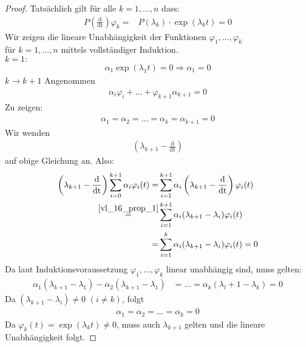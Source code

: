 \begin{proof}
	Tatsächlich gilt für alle $k = 1, \hdots, n $ dass: 
	\begin{align*}
		P \left(\frac{\mathrm{d}}{\mathrm{dt}}\right) \varphi_k = &
			P(\lambda_k)  \cdot \exp(\lambda_k t) = 0
	\end{align*}
	Wir zeigen die lineare Unabhängigkeit der Funktionen $\varphi_1, \hdots, 
	\varphi_k$ \\ für $k = 1, \hdots, n$ mittels vollständiger Induktion. \\
	\emph{$k=1:$} 
	\begin{align*}
		\alpha_1\exp(\lambda_1t) = 0 \Rightarrow \alpha_1 = 0
	\end{align*}
	\emph{$k \rightarrow k+1$} Angenommen
	\begin{align*}
		\alpha_i \varphi_i + \hdots + \varphi_{k+1} \alpha_{k+1} = 0
	\end{align*}
	Zu zeigen: 
	\begin{align*}
		\alpha_1 = \alpha_2 = \hdots = \alpha_k = \alpha_{k+1} = 0
	\end{align*}		
	Wir wenden
	\begin{align*}
		\left(\lambda_{k+1} - \frac{\mathrm{d}}{\mathrm{dt}}\right)
	\end{align*} auf obige Gleichung an.
	Also: 
	\begin{align*}
		\left(\lambda_{k+1}-\frac{\mathrm{d}}{\mathrm{dt}}\right) 
			\sum_{i=0}^{k+1} \alpha_i \varphi_i(t) 
		= & \sum_{i=1}^{k+1} \alpha_i \left( \lambda_{k+1} - 
			\frac{\mathrm{d}}{\mathrm{dt}} \right) \varphi_i(t) \\ 
		\overset{\ref{vl_16_prop_1}}{=} & \sum_{i=1}^{k+1} \alpha_i (\lambda_{k+1} - \lambda_i) 
			\varphi_i(t) \\
		= & \sum_{i = 1}^k \alpha_i(\lambda_{k+1} - \lambda_i) \varphi_i(t) 
	= 0
	\end{align*}
	Da laut Induktionsvoraussetzung $\varphi_1, \hdots, \varphi_k$ linear 
	unabhängig sind, muss gelten:
	\begin{align*}
		\alpha_1(\lambda_{k+1}-\lambda_1) - \alpha_2(\lambda_{k+1}- \lambda_1)
		& = \hdots = \alpha_k(\lambda_l+1 - \lambda_k ) = 0
	\end{align*}
	Da $(\lambda_{k+1}- \lambda_i) \neq 0$ $(i \neq k)$, folgt 
	\begin{align*}
		\alpha_1 = \alpha_2 = \hdots = \alpha_k = 0
	\end{align*}		
	Da $\varphi_k(t) = \exp(\lambda_k t) \neq 0$, muss auch $\lambda_{k+1}$ 
	gelten und die lineare Unabhängigkeit folgt.
\end{proof}

